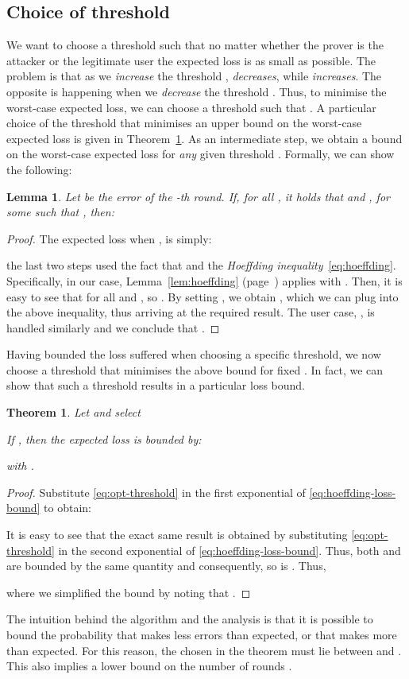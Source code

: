 \documentclass[a4paper]{article}
\newenvironment{IEEEproof}{\begin{proof}}{\end{proof}}
\theoremstyle{plain} \newtheorem{remark}{Remark}
\theoremstyle{plain} \newtheorem{definition}{Definition}
\theoremstyle{plain} \newtheorem{example}{Example}
\theoremstyle{plain} \newtheorem{assumption}{Assumption}
\theoremstyle{plain} \newtheorem{conjecture}{Conjecture}
\theoremstyle{plain} \newtheorem{theorem}{Theorem}
\theoremstyle{plain} \newtheorem{proposition}{Proposition}
\theoremstyle{plain} \newtheorem{lemma}{Lemma}
\theoremstyle{plain} \newtheorem{corollary}{Corollary}
\begin{document}
\subsection{Choice of threshold}
\label{sec:threshold-choice}
We want to choose a threshold  such that no matter whether the
prover  is the attacker  or the legitimate user  the
expected loss  is as small as possible.  The
problem is that as we \textit{increase} the threshold ,
 \textit{decreases}, while  \textit{increases}. The opposite is happening when we
\textit{decrease} the threshold .  Thus, to minimise the
worst-case expected loss, we can choose a threshold  such that
.  A
particular choice of the threshold  that minimises an upper
bound on the worst-case expected loss is given in
Theorem~\ref{thm:threshold}.  As an intermediate step, we obtain a
bound on the worst-case expected loss for {\em any} given threshold
. Formally, we can show the following:
\begin{lemma}
  Let  be the error of the -th round.  If, for all
  , it holds that 
  and , for some  such that , then:

\end{lemma}
\begin{IEEEproof}
  The expected loss when , is simply:
  
  the last two steps used the fact that  and the
  \textit{Hoeffding inequality}~\eqref{eq:hoeffding}. Specifically, in
  our case, Lemma~\ref{lem:hoeffding} (page~\pageref{lem:hoeffding})
  applies with . Then, it is easy to see that  for all  and , so .  By setting ,
  we obtain , which we can plug into the above
  inequality, thus arriving at the required result.  The user case,
  , is handled similarly and we conclude that .
\end{IEEEproof}
Having bounded the loss suffered when choosing a specific threshold,
we now choose a threshold  that minimises the above bound for
fixed . In fact, we can show that such a threshold results in a
particular loss bound.
\begin{theorem}
  Let  and select
  
  If , then the expected loss  is
  bounded by:
  
  with .
  \label{thm:threshold}
\end{theorem}
\begin{IEEEproof}
  Substitute \eqref{eq:opt-threshold} in
  the first exponential of \eqref{eq:hoeffding-loss-bound} to obtain:
  
  It is easy to see that the exact same result is obtained by
  substituting \eqref{eq:opt-threshold} in the second exponential of \eqref{eq:hoeffding-loss-bound}.
Thus, both
   and  are bounded by the same
  quantity and consequently, so is . Thus,
  
  where we simplified the bound by noting that
  .
\end{IEEEproof}
The intuition behind the algorithm and the analysis is that it is
possible to bound the probability that  makes less errors than
expected, or that  makes more than expected.  For this reason, the
 chosen in the theorem must lie between  and . This
also implies a lower bound on the number of rounds .  
\end{document}
